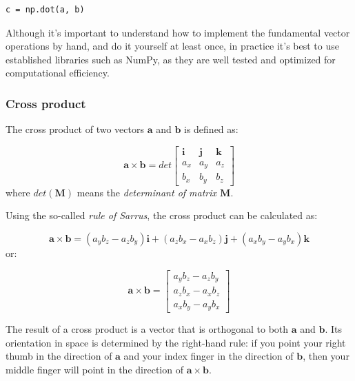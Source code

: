 \documentclass[12pt]{article}
\numberwithin{equation}{section}
\numberwithin{figure}{section}
\numberwithin{table}{section}
\begin{document}
\begin{listing}[h]
\begin{verbatim}
c = np.dot(a, b)
\end{verbatim}
\label{lst:dot_product_numpy_dot}
\end{listing}
Although it's important to understand how to implement the fundamental vector
operations by hand, and do it yourself at least once, in practice it's best to
use established libraries such as NumPy, as they are well tested and optimized
for computational efficiency.

\subsubsection{Cross product}

The cross product of two vectors $\mathbf{a}$ and
$\mathbf{b}$ is defined as:

\begin{equation}
  \mathbf{a} \times \mathbf{b} =
  det \begin{bmatrix}
    \mathbf{i} & \mathbf{j} & \mathbf{k} \\
    a_x & a_y & a_z \\
    b_x & b_y & b_z
  \end{bmatrix}
\end{equation}
where $det(\mathbf{M})$ means the \textit{determinant of matrix $\mathbf{M}$}.

Using the so-called \textit{rule of Sarrus}, the cross product can be calculated
as:

\begin{equation}
  \mathbf{a} \times \mathbf{b} = (a_y b_z - a_z b_y) \mathbf{i} +
    (a_z b_x - a_x b_z) \mathbf{j} + (a_x b_y - a_y b_x) \mathbf{k}
\end{equation}
or:

\begin{equation}
  \mathbf{a} \times \mathbf{b} =
    \begin{bmatrix}
      a_y b_z - a_z b_y \\
      a_z b_x - a_x b_z \\
      a_x b_y - a_y b_x
    \end{bmatrix}
\end{equation}

The result of a cross product is a vector that is orthogonal to both $\mathbf{a}$
and $\mathbf{b}$.
Its orientation in space is determined by the right-hand rule:
if you point your right thumb in the direction of $\mathbf{a}$ and your index
finger in the direction of $\mathbf{b}$, then your middle finger will point in
the direction of $\mathbf{a} \times \mathbf{b}$.
\end{document}
